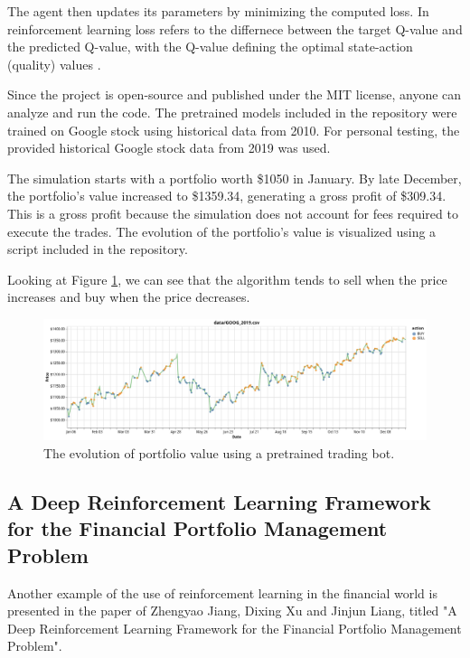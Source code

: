\documentclass[a4paper,oneside,onecolumn,12pt]{book}
\begin{document}
	The agent then updates its parameters by minimizing the computed loss. In reinforcement learning loss refers to the differnece between the target Q-value and the predicted Q-value, with the Q-value defining the optimal state-action (quality) values \cite{HMLSKT}.

	Since the project is open-source and published under the MIT license, anyone can analyze and run the code. The pretrained models included in the repository were trained on Google stock using historical data from 2010. For personal testing, the provided historical Google stock data from 2019 was used.

	The simulation starts with a portfolio worth \$1050 in January. By late December, the portfolio's value increased to \$1359.34, generating a gross profit of \$309.34. This is a gross profit because the simulation does not account for fees required to execute the trades. The evolution of the portfolio's value is visualized using a script included in the repository.

	Looking at Figure \ref{fig:STBRL portfolio evolution}, we can see that the algorithm tends to sell when the price increases and buy when the price decreases.
	\begin{figure}[H]
	\begin{center}
		\includegraphics[width=\linewidth]{kep/trade_bot_visualization.png}
		\caption{The evolution of portfolio value using a pretrained trading bot.}
		\label{fig:STBRL portfolio evolution}
	\end{center}
	\end{figure}

	\subsection{A Deep Reinforcement Learning Framework for the Financial Portfolio Management Problem \cite{ADRLFFPMP}}\label{paper_ADRLFFPMP}
	Another example of the use of reinforcement learning in the financial world is presented in the paper of Zhengyao Jiang, Dixing Xu and Jinjun Liang, titled "A Deep Reinforcement Learning Framework for the Financial Portfolio Management Problem". 
	
\end{document}
